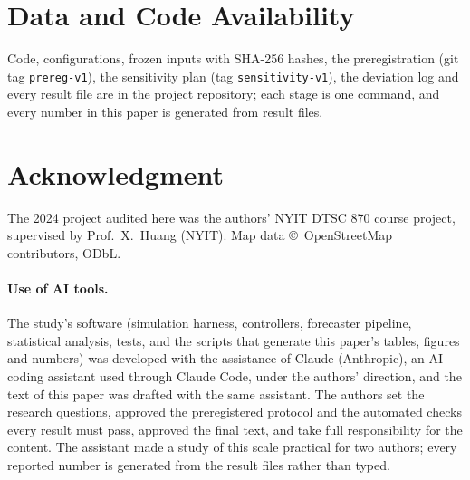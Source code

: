 \documentclass[conference]{IEEEtran}
\begin{document}
\balance
\section*{Data and Code Availability}
Code, configurations, frozen inputs with SHA-256 hashes, the preregistration (git tag \texttt{prereg-v1}), the
sensitivity plan (tag \texttt{sensitivity-v1}), the deviation log and every result file are in the project
repository; each stage is one command, and every number in this paper is generated from result files.

\section*{Acknowledgment}
The 2024 project audited here was the authors' NYIT DTSC 870 course project, supervised by Prof.~X.~Huang (NYIT).
Map data \copyright\ OpenStreetMap contributors, ODbL.

\paragraph{Use of AI tools.} The study's software (simulation harness, controllers, forecaster pipeline, statistical
analysis, tests, and the scripts that generate this paper's tables, figures and numbers) was developed with the
assistance of Claude (Anthropic), an AI coding assistant used through Claude Code, under the authors' direction, and
the text of this paper was drafted with the same assistant. The authors set the research questions, approved the
preregistered protocol and the automated checks every result must pass, approved the final text, and take full
responsibility for the content. The assistant made a study of this scale practical for two authors; every reported
number is generated from the result files rather than typed.



\end{document}
